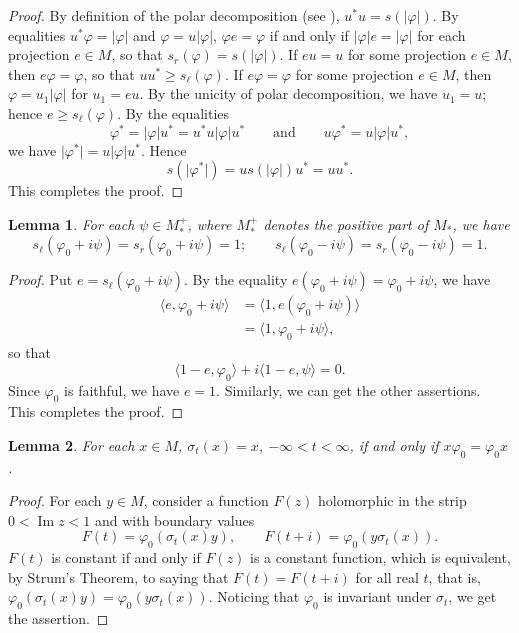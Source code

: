 \documentclass[12pt,b5paper,twoside]{article}
\theoremstyle{takesaki}
\newtheorem{lemma}{Lemma}[section]
\numberwithin{equation}{section}
\begin{document}
\begin{proof}
By definition of the polar decomposition (see \cite[pp.~61--62]{ref3}),
$u^*u=s(\lvert\varphi\rvert)$.  By equalities
$u^*\varphi=\lvert\varphi\rvert$ and
$\varphi=u\lvert\varphi\rvert$, $\varphi e=\varphi$ if and only if
$\lvert\varphi\rvert e=\lvert\varphi\rvert$ for each projection
$e\in M$, so that $s_r(\varphi)=s(\lvert\varphi\rvert)$.  If $eu=u$ for
some projection $e\in M$, then $e\varphi=\varphi$, so that
$uu^*\geq s_{\ell}(\varphi)$.  If $e\varphi=\varphi$ for some projection
$e\in M$, then $\varphi=u_1\lvert\varphi\rvert$ for $u_1=eu$.  By the
unicity of polar decomposition, we have $u_1=u$; hence
$e\geq s_{\ell}(\varphi)$.  By the equalities
\[
  \varphi^*=\lvert\varphi\rvert u^*
  =u^*u\lvert\varphi\rvert u^*
  \qquad\text{and}\qquad
  u\varphi^*=u\lvert\varphi\rvert u^*,
\]
we have $\lvert\varphi^*\rvert=u\lvert\varphi\rvert u^*$.  Hence
\[
  s(\lvert\varphi^*\rvert)
  =u s(\lvert\varphi\rvert)u^*=uu^*.
\]
This completes the proof.
\end{proof}

\begin{lemma}
\label{lem:15.7}
For each $\psi\in M_*^+$, where $M_*^+$ denotes the positive part of
$M_*$, we have
\[
  s_{\ell}(\varphi_0+i\psi)=s_r(\varphi_0+i\psi)=1;
  \qquad
  s_{\ell}(\varphi_0-i\psi)=s_r(\varphi_0-i\psi)=1.
\]
\end{lemma}

\begin{proof}
Put $e=s_{\ell}(\varphi_0+i\psi)$.  By the equality
$e(\varphi_0+i\psi)=\varphi_0+i\psi$, we have
\begin{align*}
  \langle e,\varphi_0+i\psi\rangle
    &=\langle1,e(\varphi_0+i\psi)\rangle\\
    &=\langle1,\varphi_0+i\psi\rangle,
\end{align*}
so that
\[
  \langle1-e,\varphi_0\rangle+i\langle1-e,\psi\rangle=0.
\]
Since $\varphi_0$ is faithful, we have $e=1$.  Similarly, we can get the
other assertions.  This completes the proof.
\end{proof}

\begin{lemma}
\label{lem:15.8}
For each $x\in M$, $\sigma_t(x)=x$, $-\infty<t<\infty$, if and only if
$x\varphi_0=\varphi_0x$.
\end{lemma}

\begin{proof}
For each $y\in M$, consider a function $F(z)$ holomorphic in the strip
$0<\operatorname{Im}z<1$ and with boundary values
\[
  F(t)=\varphi_0(\sigma_t(x)y),
  \qquad
  F(t+i)=\varphi_0(y\sigma_t(x)).
\]
$F(t)$ is constant if and only if $F(z)$ is a constant function, which
is equivalent, by Strum's Theorem, to saying that $F(t)=F(t+i)$ for all
real $t$, that is,
$\varphi_0(\sigma_t(x)y)=\varphi_0(y\sigma_t(x))$.  Noticing that
$\varphi_0$ is invariant under $\sigma_t$, we get the assertion.
\end{proof}
\end{document}
